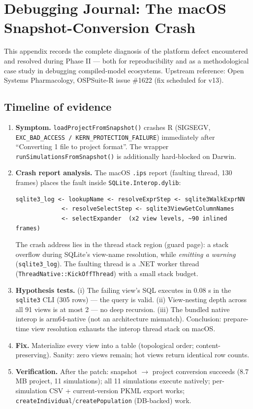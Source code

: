 \chapter{Debugging Journal: The macOS Snapshot-Conversion Crash}
\label{chap:app-debug}

This appendix records the complete diagnosis of the platform defect encountered and resolved during Phase II --- both for reproducibility and as a methodological case study in debugging compiled-model ecosystems. Upstream reference: Open Systems Pharmacology, OSPSuite-R issue \#1622 (fix scheduled for v13).

\section{Timeline of evidence}
\begin{enumerate}
\item \textbf{Symptom.} \texttt{loadProjectFromSnapshot()} crashes R (SIGSEGV, \texttt{EXC\_BAD\_ACCESS / KERN\_PROTECTION\_FAILURE}) immediately after ``Converting 1 file to project format''. The wrapper \texttt{runSimulationsFromSnapshot()} is additionally hard-blocked on Darwin.
\item \textbf{Crash report analysis.} The macOS \texttt{.ips} report (faulting thread, 130 frames) places the fault inside \texttt{SQLite.Interop.dylib}:
\begin{verbatim}
sqlite3_log <- lookupName <- resolveExprStep <- sqlite3WalkExprNN
             <- resolveSelectStep <- sqlite3ViewGetColumnNames
             <- selectExpander  (x2 view levels, ~90 inlined frames)
\end{verbatim}
The crash address lies in the thread stack region (guard page): a stack overflow during SQLite's view-name resolution, while \emph{emitting a warning} (\texttt{sqlite3\_log}). The faulting thread is a .NET worker thread (\texttt{ThreadNative::KickOffThread}) with a small stack budget.
\item \textbf{Hypothesis tests.} (i) The failing view's SQL executes in 0.08 s in the \texttt{sqlite3} CLI (305 rows) --- the query is valid. (ii) View-nesting depth across all 91 views is at most 2 --- no deep recursion. (iii) The bundled native interop is arm64-native (not an architecture mismatch). Conclusion: prepare-time view resolution exhausts the interop thread stack on macOS.
\item \textbf{Fix.} Materialize every view into a table (topological order; content-preserving). Sanity: zero views remain; hot views return identical row counts.
\item \textbf{Verification.} After the patch: snapshot $\rightarrow$ project conversion succeeds (8.7 MB project, 11 simulations); all 11 simulations execute natively; per-simulation CSV + current-version PKML export works; \texttt{createIndividual}/\texttt{createPopulation} (DB-backed) work.
\end{enumerate}

